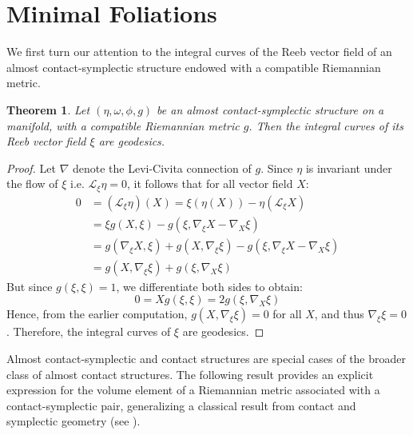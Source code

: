 \documentclass[12pt]{amsart}
\newtheorem{theorem}{Theorem}
\theoremstyle{definition}
\theoremstyle{remark}
\begin{document}
\section{Minimal Foliations}
\noindent 
We first turn our attention to the integral curves of the Reeb vector field of an almost contact-symplectic structure endowed with a compatible Riemannian metric.

\begin{theorem}
Let $(\eta, \omega, \phi, g)$ be an almost contact-symplectic structure on a manifold, with a compatible Riemannian metric $g$.
Then  the integral curves of its Reeb vector field $\xi$ are geodesics.
\end{theorem}
\begin{proof}
Let $\nabla$ denote the Levi-Civita connection of $g$.
Since $\eta$ is invariant under the flow of $\xi$ i.e. $\mathcal{L}_\xi \eta=0$, it follows that for all vector field $X$:
\begin{align*}
 	0&=(\mathcal{L}_\xi \eta ) (X)=\xi (\eta(X))-\eta (\mathcal{L}_\xi X) \\
	  &= \xi g(X,\xi)-g(\xi, \nabla_\xi X - \nabla_X \xi) \\
	  &= g(\nabla_\xi X, \xi)+g(X,\nabla_\xi \xi)-g(\xi, \nabla_\xi X - \nabla_X \xi)\\
	  &= g(X,\nabla_\xi \xi)+g(\xi, \nabla_X \xi)
  \end{align*}
But since $g(\xi, \xi) = 1$, we differentiate both sides to obtain: 
\begin{equation*}
0=Xg(\xi,\xi)=2g(\xi, \nabla_X \xi)
\end{equation*}
Hence, from the earlier computation, $g(X, \nabla_\xi \xi) = 0$ for all $X$, and thus $\nabla_\xi \xi = 0$. Therefore, the integral curves of $\xi$ are geodesics.
\end{proof}

\noindent
Almost contact-symplectic and contact structures are special cases of the broader class of almost contact structures.
The following result provides an explicit expression for the volume element of a Riemannian metric associated with a contact-symplectic pair, generalizing a classical result from contact and symplectic geometry (see \cite{Blairbook}).
\end{document}
